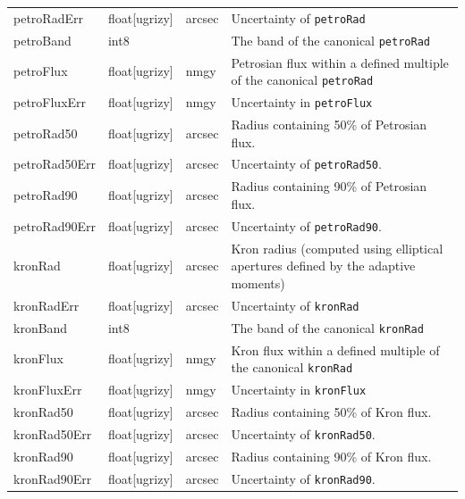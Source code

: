 \documentclass[12pt]{article}
\begin{document}
\begin{center}
\begin{longtable}{p{3cm}p{2cm}p{2cm}p{5cm}}
petroRadErr & float[ugrizy] & arcsec & Uncertainty of {\tt petroRad} \\

petroBand & int8 & ~ & The band of the canonical {\tt petroRad} \\

petroFlux & float[ugrizy] & nmgy & Petrosian flux within a defined multiple of the canonical {\tt petroRad} \\

petroFluxErr & float[ugrizy] & nmgy & Uncertainty in {\tt petroFlux} \\

petroRad50 & float[ugrizy] & arcsec & Radius containing 50\% of Petrosian flux. \\

petroRad50Err & float[ugrizy] & arcsec & Uncertainty of {\tt petroRad50}. \\

petroRad90 & float[ugrizy] & arcsec & Radius containing 90\% of Petrosian flux. \\

petroRad90Err & float[ugrizy] & arcsec & Uncertainty of {\tt petroRad90}. \\


kronRad & float[ugrizy] & arcsec & Kron radius (computed using elliptical apertures defined by the adaptive moments) \\

kronRadErr & float[ugrizy] & arcsec & Uncertainty of {\tt kronRad} \\

kronBand & int8 & ~ & The band of the canonical {\tt kronRad} \\

kronFlux & float[ugrizy] & nmgy & Kron flux within a defined multiple of the canonical {\tt kronRad} \\

kronFluxErr & float[ugrizy] & nmgy & Uncertainty in {\tt kronFlux} \\

kronRad50 & float[ugrizy] & arcsec & Radius containing 50\% of Kron flux. \\

kronRad50Err & float[ugrizy] & arcsec & Uncertainty of {\tt kronRad50}. \\

kronRad90 & float[ugrizy] & arcsec & Radius containing 90\% of Kron flux. \\

kronRad90Err & float[ugrizy] & arcsec & Uncertainty of {\tt kronRad90}. \\



\end{longtable}
\end{center}
\end{document}
